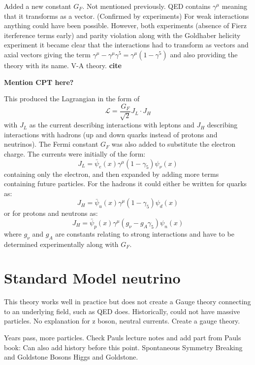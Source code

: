 Added a new constant $G_F$. Not mentioned previously. QED contains $\gamma^\mu$ meaning that it transforms as a vector. (Confirmed by experiments) For weak interactions anything could have been possible. However, both experiments (absence of Fierz iterference terms early) and parity violation along with the Goldhaber helicity experiment it became clear that the interactions had to transform as vectors and axial vectors giving the term $\gamma^\mu - \gamma^\mu \gamma^5 =  \gamma^\mu (1- \gamma^5)$ and also providing the theory with its name. V-A theory. 
\textbf{cite}

\textbf{Mention CPT here?}

This produced the Lagrangian in the form of 
\begin{equation}
\mathcal{L} = \frac{G_F}{\sqrt{2}}J_L \cdot J_H
\end{equation}
with $J_L$ as the current describing interactions with leptons and $J_H$ describing interactions with hadrons (up and down quarks instead of protons and neutrinos). The Fermi constant $G_F$ was also added to substitute the electron charge. The currents were initially of the form:
\begin{equation}
J_L = \bar{\psi}_e(x)\gamma^\mu (1-\gamma_5) \psi_\nu(x)
\end{equation}
containing only the electron, and then expanded by adding more terms containing future particles. For the hadrons it could either be written for quarks as:
\begin{equation}
J_H = \bar{\psi}_u(x)\gamma^\mu (1-\gamma_5) \psi_d(x)
\end{equation}
or for protons and neutrons as:
\begin{equation}
J_H = \bar{\psi}_p(x)\gamma^\mu (g_\nu-g_A\gamma_5) \psi_n(x)
\end{equation}
where $g_\nu$ and $g_A$ are constants relating to strong interactions and have to be determined experimentally along with $G_F$.

\section{Standard Model neutrino}\label{subsection:SMN}
This theory works well in practice but does not create a Gauge theory connecting to an underlying field, such as QED does. Historically, could not have massive particles. No explanation for z boson, neutral currents. Create a gauge theory.

Years pass, more particles. 
Check Pauls lecture notes and add part from Pauls book: Can also add history before this point.
Spontaneous Symmetry Breaking and Goldstone Bosons
Higgs and Goldstone.

